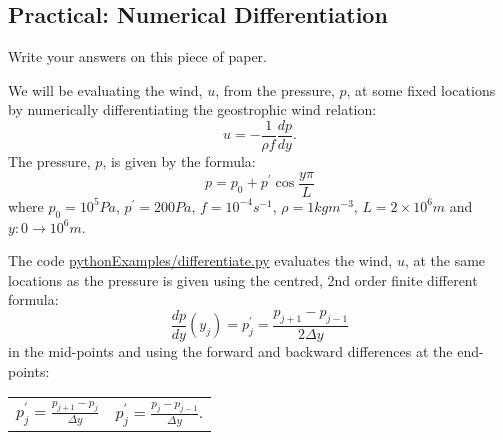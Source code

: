\subsection{Practical: Numerical Differentiation}

Write your answers on this piece of paper.

We will be evaluating the wind, $u$, from the pressure, $p$, at some fixed locations by numerically differentiating the geostrophic wind relation:
\begin{equation*}
u = -\frac{1}{\rho f}\frac{dp}{dy}.
\end{equation*}
The pressure, $p$, is given by the formula:
\begin{equation*}
p = p_0 + p^\prime \cos\frac{y\pi}{L}
\end{equation*}
where $p_0=10^5 Pa$, $p^\prime=200 Pa$, $f = 10^{-4}s^{-1}$, $\rho=1 kg m^{-3}$, $L = 2\times 10^6 m$ and $y:0\rightarrow 10^6 m$.

The code \url{pythonExamples/differentiate.py} evaluates the wind, $u$, at the same locations as the pressure is given using the centred, 2nd order finite different formula:
\[
\frac{dp}{dy}(y_j) = p^\prime_j = \frac{p_{j+1} - p_{j-1}}{2 \Delta y}
\]
in the mid-points and using the forward and backward differences at the end-points:
\begin{center}\begin{tabular}{cc}
$p^\prime_j = \frac{p_{j+1} - p_{j}}{\Delta y}$
&
$p^\prime_j = \frac{p_{j} - p_{j-1}}{\Delta y}$.
\end{tabular}\end{center}

